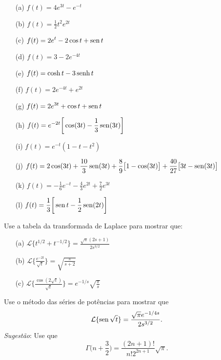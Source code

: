\begin{Answer}
\begin{itemize}
  \item[(a)] $\displaystyle f(t) = 4e^{3t} - e^{-t}$
  \item[(b)] $\displaystyle f(t) = \frac{1}{2} t^2 e^{2t}$
  \item[(c)] $\displaystyle f(t) = 2e^{t} - 2 \cos t + \operatorname{sen} t$
  \item[(d)] $\displaystyle f(t) = 3 -2 e^{-4t}$
  \item[(e)] $\displaystyle f(t) = \cosh t - 3 \operatorname{senh} t$
  \item[(f)] $\displaystyle f(t) = 2e^{-4t} + e^{2t}$
  \item[(g)] $\displaystyle f(t) = 2e^{3t} + \cos t + \operatorname{sen} t$
  \item[(h)] $\displaystyle f(t) = e^{-2t}\bigg[ \cos(3t) - \frac{1}{3} \operatorname{sen} (3t) \bigg]$
  \item[(i)] $\displaystyle f(t) = e^{-t}(1-t-t^2)$
  \item[(j)] $\displaystyle f(t) = 2\cos(3t) +\frac{10}{3} \operatorname{sen}(3t) +\frac{8}{9} \big[1-\cos(3t)\big] + \frac{40}{27} \big[3t - \operatorname{sen}(3t)\big]$
  \item[(k)] $\displaystyle f(t) = -\frac{1}{6} e^{-t} -\frac{4}{3} e^{2t} + \frac{7}{2} e^{3t}$
  \item[(l)] $\displaystyle f(t) = \frac{1}{3} \bigg[ \operatorname{sen} t - \frac{1}{2}\operatorname{sen}(2t) \bigg]$
\end{itemize}
\end{Answer}


\begin{Exercise}
Use a tabela da transformada de Laplace para mostrar que:

\begin{itemize}
  \item[(a)] $\displaystyle \mathcal{L} \big\{ t^{1/2}+ t^{-1/2} \big\} = \frac{\sqrt{\pi}(2s+1)}{2s^{3/2}}$
  \item[(b)] $\displaystyle \mathcal{L} \bigg\{ \frac{e^{-2t}}{\sqrt{t}} \bigg\} = \sqrt{\frac{\pi}{s+2}}$
  \item[(c)] $\displaystyle \mathcal{L} \bigg\{ \frac{\cos(2\sqrt{t}) }{\sqrt{t}} \bigg\} = e^{-1/s}\sqrt{\frac{\pi}{s}}$
\end{itemize}
\end{Exercise}


\begin{Exercise}
Use o método das séries de potências para mostrar que \[\mathcal{L} \{\operatorname{sen} \sqrt{t} \} =  \frac{\sqrt{\pi} e^{-1/4s}}{2s^{3/2}}.\]
\emph{Sugestão}: Use que \[\Gamma\bigg( n + \frac{3}{2} \bigg) = \frac{ (2n+1)!}{ n! 2^{2n+1}}\sqrt{\pi}.\]
\end{Exercise}


